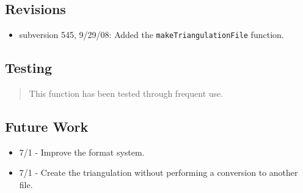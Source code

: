 \documentclass[10pt]{article}%
\begin{document}
\subsection*{Revisions}

\begin{itemize}\item  subversion 545, 9/29/08: Added the \texttt{makeTriangulationFile} function.
\end{itemize}

\subsection*{Testing}

\begin{quotation} This function has been tested through frequent use.\end{quotation}

\subsection*{Future Work}

\begin{itemize}\item  7/1 - Improve the format system.
\item  7/1 - Create the triangulation without performing a conversion to another file.
\end{itemize}
    

%
\end{document}

